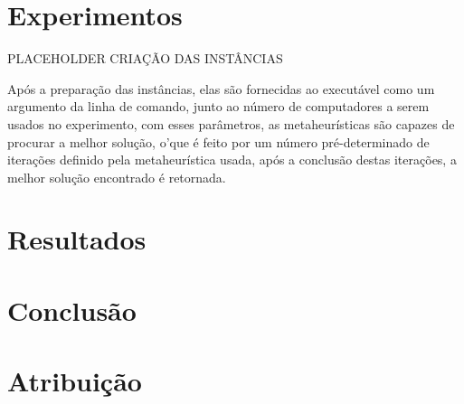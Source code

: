 \documentclass[12pt]{article}
\begin{document}
\section{Experimentos}

PLACEHOLDER CRIAÇÃO DAS INSTÂNCIAS 

Após a preparação das instâncias, elas são fornecidas ao executável como um argumento da linha de comando, junto ao número de computadores a serem usados no experimento, com esses parâmetros, as metaheurísticas são capazes de procurar a melhor solução, o'que é feito por um número pré-determinado de iterações definido pela metaheurística usada, após a conclusão destas iterações,  a melhor solução encontrado é retornada.



\section{Resultados}


\section{Conclusão}


\section{Atribuição}
\end{document}
